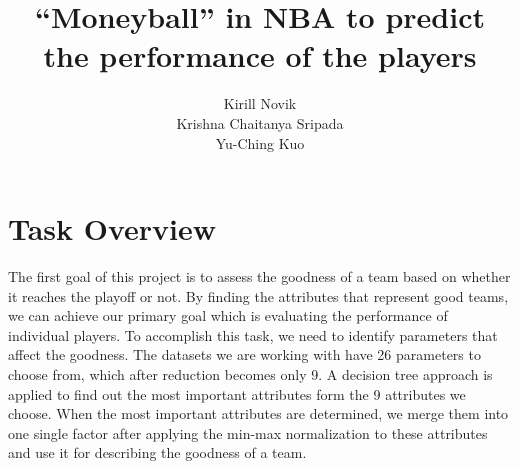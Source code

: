 \documentclass{acm_proc_article-sp}
\begin{document}
\title{``Moneyball'' in NBA to predict the performance of the players}
\author{
%
\alignauthor 
Kirill Novik\\
\alignauthor
Krishna Chaitanya Sripada\\
\alignauthor
Yu-Ching Kuo\\
}
\maketitle
\section*{Task Overview}
The first goal of this project is to assess the goodness of a team based on whether it reaches the playoff or not. By finding the attributes that represent good teams, we can achieve our primary goal which is evaluating the performance of individual players. To accomplish this task, we need to identify parameters that affect the goodness. The datasets we are working with have 26 parameters to choose from, which after reduction becomes only 9. A decision tree approach is applied to find out the most important attributes form the 9 attributes we choose. When the most important attributes are determined, we merge them into one single factor after applying the min-max normalization to these attributes and use it for describing the goodness of a team.
\end{document}
